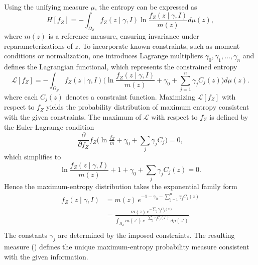 Using the unifying measure $\mu$, the entropy can be expressed as
\begin{equation}
	H[f_Z] = - \int_{\Omega_Z} f_Z(z \mid \gamma, I) 
	\ln \frac{f_Z(z \mid \gamma, I)}{m(z)} d\mu(z),
\end{equation}
where $m(z)$ is a reference measure, ensuring invariance under reparameterizations of $z$. 
To incorporate known constraints, such as moment conditions or normalization, one introduces Lagrange multipliers $\gamma_0, \gamma_1, \dots, \gamma_n$ and defines the Lagrangian functional, which represents the constrained entropy
\begin{equation}
	\mathcal{L}[f_Z] =- \int_{\Omega_Z} 
	f_Z(z \mid \gamma, I)\Big(
	\ln \frac{f_Z(z \mid \gamma, I)}{m(z)}
	+ \gamma_0 + \sum_{j=1}^n \gamma_j C_j(z)
	\Big) d\mu(z).
\end{equation}
where each $C_j(z)$ denotes a constraint function. Maximizing $\mathcal{L}[f_Z]$ with respect to $f_Z$ yields the probability distribution of maximum entropy consistent with the given constraints. The maximum of $\mathcal{L}$ with respect to $f_Z$ is defined by the Euler-Lagrange condition
\begin{equation}
	\frac{\partial}{\partial f_Z} f_Z\Big(\ln \tfrac{f_Z}{m} + \gamma_0 + \sum_j \gamma_j C_j\Big) = 0,
\end{equation}
which simplifies to
\begin{equation}
	\ln \frac{f_Z(z \mid \gamma, I)}{m(z)} + 1 + \gamma_0 + \sum_j \gamma_j C_j(z) = 0.
\end{equation}
Hence the maximum-entropy distribution takes the exponential family form
\begin{equation}
	\begin{split}
		f_Z(z \mid \gamma, I)
		&= m(z)\, e^{-1 - \gamma_0 - \sum_{j=1}^n \gamma_j C_j(z)} \\
		&= \frac{m(z)\, e^{-\sum_j \gamma_j C_j(z)}}{
			\int_{\Omega_Z} m(z')\, e^{-\sum_j \gamma_j C_j(z')}\, d\mu(z')}.\\
	\end{split}
\end{equation}
The constants $\gamma_j$ are determined by the imposed constraints. The resulting measure () defines the unique maximum-entropy probability measure consistent with the given information.

